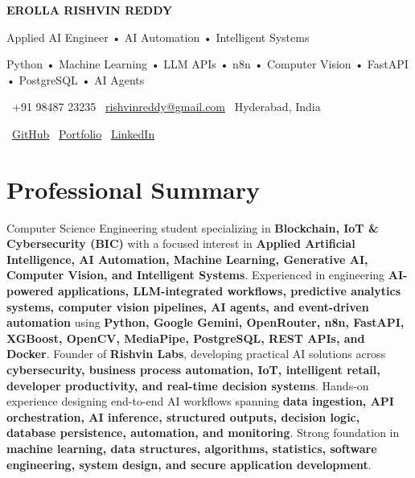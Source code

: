 \documentclass[a4paper,11pt]{article}
\begin{document}

\begin{center}

{\Huge \textbf{EROLLA RISHVIN REDDY}}

\vspace{4pt}

{\large Applied AI Engineer • AI Automation • Intelligent Systems}

\vspace{5pt}

{\small
Python • Machine Learning • LLM APIs • n8n • Computer Vision • FastAPI • PostgreSQL • AI Agents
}

\vspace{8pt}

\small
\faPhone\ +91 98487 23235
\hspace{12pt}
\faEnvelope\ \href{mailto:rishvinreddy@gmail.com}{rishvinreddy@gmail.com}
\hspace{12pt}
\faMapMarker*\ Hyderabad, India

\vspace{6pt}

\faGithub\
\href{https://github.com/RishvinReddy}{GitHub}
\hspace{14pt}
\faGlobe\
\href{https://rishvinreddy.vercel.app}{Portfolio}
\hspace{14pt}
\faLinkedin\
\href{https://www.linkedin.com/in/rishvinreddy/}{LinkedIn}

\end{center}

\vspace{-8pt}


\section{Professional Summary}

Computer Science Engineering student specializing in \textbf{Blockchain, IoT \& Cybersecurity (BIC)} with a focused interest in \textbf{Applied Artificial Intelligence, AI Automation, Machine Learning, Generative AI, Computer Vision, and Intelligent Systems}. Experienced in engineering \textbf{AI-powered applications, LLM-integrated workflows, predictive analytics systems, computer vision pipelines, AI agents, and event-driven automation} using \textbf{Python, Google Gemini, OpenRouter, n8n, FastAPI, XGBoost, OpenCV, MediaPipe, PostgreSQL, REST APIs, and Docker}. Founder of \textbf{Rishvin Labs}, developing practical AI solutions across \textbf{cybersecurity, business process automation, IoT, intelligent retail, developer productivity, and real-time decision systems}. Hands-on experience designing end-to-end AI workflows spanning \textbf{data ingestion, API orchestration, AI inference, structured outputs, decision logic, database persistence, automation, and monitoring}. Strong foundation in \textbf{machine learning, data structures, algorithms, statistics, software engineering, system design, and secure application development}.
\end{document}

